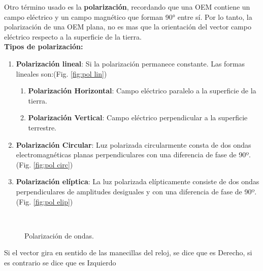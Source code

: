 \documentclass[
	12pt, %
	fleqn, %
	a4paper, %
	oneside, %
]{LegrandOrangeBook}
\begin{document}
Otro término usado es la \textbf{polarización}, recordando que una OEM contiene un campo eléctrico y un campo magnético que forman 90° entre sí. Por lo tanto, la polarización de una OEM plana, no es mas que la orientación del vector campo eléctrico respecto a la superficie de la tierra.\\
\textbf{Tipos de polarización:}
\begin{enumerate}
\item \textbf{Polarización lineal}: Si la polarización permanece constante. Las formas lineales son:(Fig. \ref{fig:pol lin})
\begin{enumerate}
\item \textbf{Polarización Horizontal}: Campo eléctrico paralelo a la superficie de la tierra.
\item \textbf{Polarización Vertical}: Campo eléctrico perpendicular a la superficie terrestre.
\end{enumerate}
\item \textbf{Polarización Circular}: Luz polarizada circularmente consta de dos ondas electromagnéticas planas perpendiculares con una diferencia de fase de 90º. (Fig. \ref{fig:pol circ})
\item \textbf{Polarización elíptica}: La luz polarizada elípticamente consiste de dos ondas perpendiculares de amplitudes desiguales y con una diferencia de fase de 90º. (Fig. \ref{fig:pol elip})
\end{enumerate}
\begin{figure}[]
\centering
{}
\\
\caption{Polarización de ondas.}
\end{figure}
\begin{notation}
Si el vector gira en sentido de las manecillas del reloj, se dice que es Derecho, si es contrario se dice que es Izquierdo
\end{notation}
\end{document}
